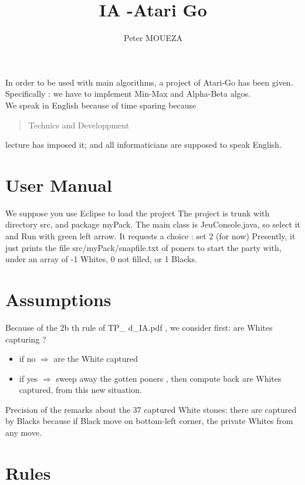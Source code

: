 \documentclass{book}
\newcommand{\tmtextbf}[1]{{\bfseries{#1}}}
\begin{document}
\title{IA -Atari Go}
\author{Peter MOUEZA}
\maketitle


In order to be used with main algorithms, a project of Atari-Go has been given.
Specifically : we have to implement Min-Max  and Alpha-Beta algos.\\
We speak in English because of time sparing because \begin{quotation}
Technics and Developpment
\end{quotation} lecture has imposed it; and all informaticians are supposed to speak English.


\chapter{User Manual}

We suppose you use Eclipse to load the project 
The project is trunk with directory src, and package myPack.
The main class is JeuConsole.java, so select it and Run with green left arrow.
It requests a choice : set 2 (for now)
Presently, it just prints the file src/myPack/snapfile.txt of poners to start the party with, under an array of -1 Whites, 0 not filled, or 1 Blacks.
\chapter{Assumptions}
Because of the 2b th rule of 
TP\_
d\_IA.pdf , we consider first: are Whites capturing 
?\\
\begin{itemize}
\item if no 
$
\Rightarrow
$
are the White captured
\item if yes 
$
\Rightarrow
$
sweep away the gotten poners , then compute back are Whites captured, from this new situation.
\end{itemize}

Precision of the remarks about the 37 captured White stones: there are captured by Blacks because if Black move on bottom-left corner, the private Whites from any move.
\chapter{Rules}
\end{document}
